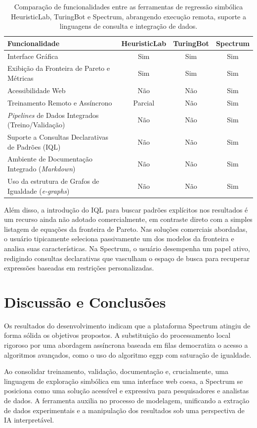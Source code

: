 \begin{table}[htbp]
    \centering
    \caption{Comparação de funcionalidades entre as ferramentas de regressão simbólica HeuristicLab, TuringBot e Spectrum, abrangendo execução remota, suporte a linguagens de consulta e integração de dados.}
    \label{tab:feature_comparison}
    \begin{tabular}{p{7.5cm}ccc}
        \toprule
        \textbf{Funcionalidade} & \textbf{HeuristicLab} & \textbf{TuringBot} & \textbf{Spectrum} \\
        \midrule
        Interface Gráfica & Sim & Sim & Sim \\
        Exibição da Fronteira de Pareto e Métricas & Sim & Sim & Sim \\
        Acessibilidade Web & Não & Não & Sim \\
        Treinamento Remoto e Assíncrono & Parcial & Não & Sim \\
        \textit{Pipelines} de Dados Integrados (Treino/Validação) & Não & Não & Sim \\
        Suporte a Consultas Declarativas de Padrões (IQL) & Não & Não & Sim \\
        Ambiente de Documentação Integrado (\textit{Markdown}) & Não & Não & Sim \\
        Uso da estrutura de Grafos de Igualdade (\textit{e-graphs}) & Não & Não & Sim \\
        \bottomrule
    \end{tabular}
\end{table}

Além disso, a introdução do IQL para buscar padrões explícitos nos resultados é um recurso ainda não adotado comercialmente, em contraste direto com a simples listagem de equações da fronteira de Pareto. Nas soluções comerciais abordadas, o usuário tipicamente seleciona passivamente um dos modelos da fronteira e analisa suas características. Na Spectrum, o usuário desempenha um papel ativo, redigindo consultas declarativas que vasculham o espaço de busca para recuperar expressões baseadas em restrições personalizadas.

\section{Discussão e Conclusões}
\label{sec:results_discussion}
Os resultados do desenvolvimento indicam que a plataforma Spectrum atingiu de forma sólida os objetivos propostos. A substituição do processamento local rigoroso por uma abordagem assíncrona baseada em filas democratiza o acesso a algoritmos avançados, como o uso do algoritmo eggp com saturação de igualdade.

Ao consolidar treinamento, validação, documentação e, crucialmente, uma linguagem de exploração simbólica em uma interface web coesa, a Spectrum se posiciona como uma solução acessível e expressiva para pesquisadores e analistas de dados. A ferramenta auxilia no processo de modelagem, unificando a extração de dados experimentais e a manipulação dos resultados sob uma perspectiva de IA interpretável.
